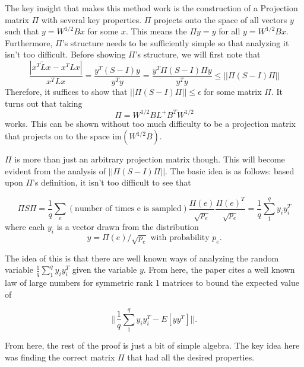 \documentclass[12pt,twoside]{article}
\begin{document}
The key insight that makes this method work is the construction of a Projection matrix $\Pi$ with several key properties. $\Pi$ projects onto the space of all vectors $y$ such that $y = W^{1/2}Bx$ for some $x$. This means the $\Pi y = y$ for all $y = W^{1/2}Bx$. Furthermore, $\Pi$'s structure needs to be sufficiently simple so that analyzing it isn't too difficult. Before showing $\Pi$'s structure, we will first note that 
%
\begin{equation*}
\frac{|x^T\tilde{L}x - x^TLx|}{x^TLx} = \frac{y^T(S-I)y}{y^Ty} 
            = \frac{y^T\Pi(S-I)\Pi y}{y^Ty} \leq ||\Pi(S-I)\Pi||
\end{equation*}
%
Therefore, it suffices to show that $||\Pi(S-I)\Pi|| \leq \epsilon$ for some matrix $\Pi$. It turns out that taking
%
\begin{equation}
\Pi = W^{1/2}BL^+B^TW^{1/2}
\end{equation}
%
works. This can be shown without too much difficulty to be a projection matrix that projects on to the space $\text{im}(W^{1/2}B)$. 

$\Pi$ is more than just an arbitrary projection matrix though. This will become evident from the analysis of $||\Pi(S-I)\Pi||$. The basic idea is as follows: based upon $\Pi$'s definition, it isn't too difficult to see that 

\begin{equation*}
\Pi S \Pi = \frac{1}{q}\sum_{e}(\text{number of times e is sampled})\frac{\Pi(e)}{\sqrt{p_e}}\frac{\Pi(e)^T}{\sqrt{p_e}}= \frac{1}{q}\sum_1^q y_iy_i^T
\end{equation*}
%
where each $y_i$ is a vector drawn from the distribution
%
\begin{equation*}
y = \Pi(e)/\sqrt{p_e} \text{ with probability } p_e.
\end{equation*}

The idea of this is that there are well known ways of analyzing the random variable $\frac{1}{q}\sum_1^q y_iy_i^T$ given the variable $y$. From here, the paper cites a well known law of large numbers for symmetric rank 1 matrices to bound the expected value of 

\begin{equation*}
||\frac{1}{q}\sum_1^q y_iy_i^T - E[yy^T]||.
\end{equation*}

From here, the rest of the proof is just a bit of simple algebra. The key idea here was finding the correct matrix $\Pi$ that had all the desired properties.
\end{document}
